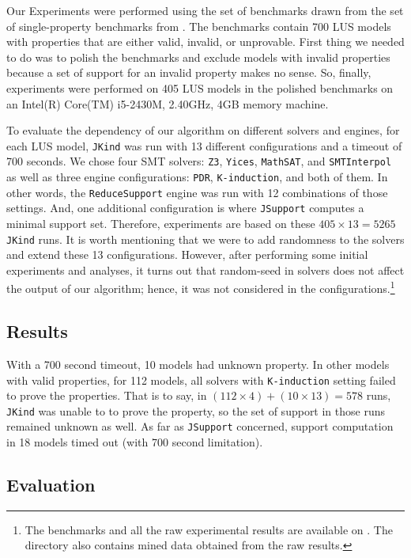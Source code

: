
Our Experiments were performed using the set of benchmarks drawn from the set of single-property benchmarks from \cite{benchmarks}. The benchmarks contain 700 LUS models with properties that are either valid, invalid, or unprovable. First thing we needed to do was to polish the benchmarks and exclude models with invalid properties because a set of support for an invalid property makes no sense. So, finally, experiments were performed on 405 LUS models in the polished benchmarks on an Intel(R) Core(TM) i5-2430M, 2.40GHz, 4GB memory machine.

To evaluate the dependency of our algorithm on different solvers and engines, for each LUS model, \texttt{JKind} was run with 13 different configurations and a timeout of 700 seconds. We chose four SMT solvers: \texttt{Z3}, \texttt{Yices}, \texttt{MathSAT}, and \texttt{SMTInterpol} as well as three engine configurations: \texttt{PDR},
\texttt{K-induction}, and both of them. In other words, the \texttt{ReduceSupport} engine was run with 12 combinations of those settings. And, one additional configuration is where \texttt{JSupport} computes a minimal support set. Therefore, experiments are based on these $405 \times 13 = 5265$ \texttt{JKind} runs. It is worth mentioning that we were to add randomness to the solvers and extend these 13 configurations. However, after performing some initial experiments and analyses, it turns out that random-seed in solvers does not affect the output of our algorithm; hence, it was not considered in the configurations.\footnote{The benchmarks and all the raw experimental results are available on \cite{expr}. The directory also contains mined data obtained from the raw results.}

\subsection{Results}

With a 700 second timeout, 10 models had unknown property. In other models with valid properties, for 112 models, all solvers with \texttt{K-induction} setting failed to prove the properties. That is to say, in $(112 \times 4) + (10 \times 13) = 578$ runs, \texttt{JKind} was unable to to prove the property, so the set of support in those runs remained unknown as well. As far as \texttt{JSupport} concerned, support computation in 18 models timed out (with 700 second limitation).

\subsection{Evaluation}
\label{subsec:eval}

